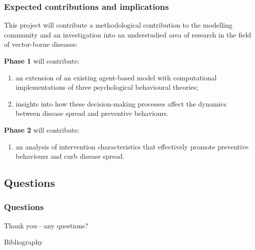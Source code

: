 \documentclass[8pt]{beamer}
\begin{document}
\begin{frame}
\frametitle{Expected contributions and implications}

This project will contribute a \alert{methodological contribution} to the modelling community and an \alert{investigation into an understudied area of research} in the field of vector-borne diseases:

\vspace{.5cm}
\textbf{Phase 1} will contribute:

\begin{enumerate}
    \item an extension of an existing agent-based model with computational implementations of three psychological behavioural theories;
    \item insights into how these decision-making processes affect the dynamics between disease spread and preventive behaviours.
\end{enumerate}

\vspace{.5cm}
\textbf{Phase 2} will contribute:

\begin{enumerate}
    \item an analysis of intervention characteristics that effectively promote preventive behaviours and curb disease spread.
\end{enumerate}

\end{frame}

\subsection{Questions}

\begin{frame}
\frametitle{Questions}
\Large Thank you---any questions?
\end{frame}



\begin{frame}{Bibliography}
\printbibliography[heading=bibnumbered]
\end{frame}
\end{document}
